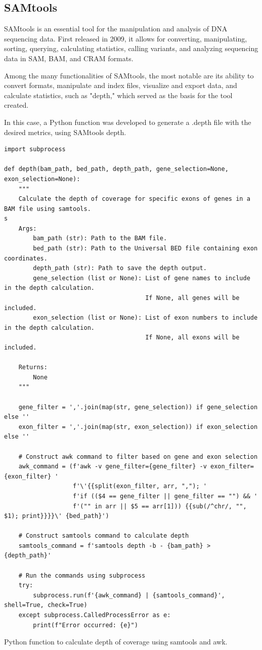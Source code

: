 \subsection{SAMtools}

SAMtools is an essential tool for the manipulation and analysis of DNA sequencing data. First released in 2009, it allows for converting, manipulating, sorting, querying, calculating statistics, calling variants, and analyzing sequencing data in SAM, BAM, and CRAM formats. \cite{samtools}

Among the many functionalities of SAMtools, the most notable are its ability to convert formats, manipulate and index files, visualize and export data, and calculate statistics, such as "depth," which served as the basis for the tool created. \cite{samtools}

In this case, a Python function was developed to generate a .depth file with the desired metrics, using SAMtools depth.

\begin{listing}[h]
\begin{verbatim}
import subprocess

def depth(bam_path, bed_path, depth_path, gene_selection=None, exon_selection=None): 
    """ 
    Calculate the depth of coverage for specific exons of genes in a BAM file using samtools.
s
    Args: 
        bam_path (str): Path to the BAM file.
        bed_path (str): Path to the Universal BED file containing exon coordinates.
        depth_path (str): Path to save the depth output.
        gene_selection (list or None): List of gene names to include in the depth calculation. 
                                       If None, all genes will be included.
        exon_selection (list or None): List of exon numbers to include in the depth calculation. 
                                       If None, all exons will be included.

    Returns: 
        None
    """ 
    
    gene_filter = ','.join(map(str, gene_selection)) if gene_selection else '' 
    exon_filter = ','.join(map(str, exon_selection)) if exon_selection else ''
    
    # Construct awk command to filter based on gene and exon selection
    awk_command = (f'awk -v gene_filter={gene_filter} -v exon_filter={exon_filter} '
                   f'\'{{split(exon_filter, arr, ","); '
                   f'if (($4 == gene_filter || gene_filter == "") && '
                   f'("" in arr || $5 == arr[1])) {{sub(/^chr/, "", $1); print}}}}\' {bed_path}')
    
    # Construct samtools command to calculate depth
    samtools_command = f'samtools depth -b - {bam_path} > {depth_path}'
    
    # Run the commands using subprocess
    try:
        subprocess.run(f'{awk_command} | {samtools_command}', shell=True, check=True)
    except subprocess.CalledProcessError as e:
        print(f"Error occurred: {e}")
\end{verbatim}
\caption{Python function to calculate depth of coverage using samtools and awk.}
\label{lbl:snippet-test}
\end{listing}

